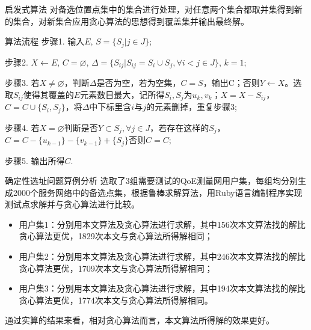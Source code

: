 \documentclass[10pt]{beamer}
\begin{document}
\begin{frame}{启发式算法}
对备选位置点集中的集合进行处理，对任意两个集合都取并集得到新的集合，对新集合应用贪心算法的思想得到覆盖集并输出最终解。
\begin{alertblock}{算法流程}
步骤1. 输入$E$, $S=\{S_j|j\in J\}$;

步骤2. $X\leftarrow E$, $C=\varnothing$, $\Delta = \{S_{ij}|S_{ij}=S_i\cup S_j, \forall i <j\in J\}$, $k=1$;

步骤3. 若$X\neq \varnothing$，判断$\Delta$是否为空，若为空集，$C=S$，输出C；否则$Y\leftarrow X$。选取$S_{ij}$使得其覆盖的$E$元素数目最大，记所得$S_i,S_j$为$u_k,v_k$；$X=X -S_{ij}$，$C=C\cup\{S_i,S_j\}$，将$\Delta$中下标里含$i$与$j$的元素删掉，重复步骤3;

步骤4. 若$X = \varnothing$判断是否$Y\subset S_j,\forall j\in J$，若存在这样的$S_j$，$C=C-\{u_{k-1}\}-\{v_{k-1}\}+\{S_j\}$否则$C=C$;

步骤5. 输出所得$C$.

\end{alertblock}

\end{frame}
\begin{frame}{确定性选址问题算例分析}
选取了3组需要测试的QoE测量网用户集，每组均分别生成2000个服务网络中的备选点集，根据鲁棒求解算法，用Ruby语言编制程序实现测试点求解并与贪心算法进行比较。
\begin{itemize}  
  \item 用户集1：分别用本文算法及贪心算法进行求解，其中{\color{red}156}次本文算法找的解比贪心算法更优，{\color{blue}1829}次本文与贪心算法所得解相同；
  \item 用户集2：分别用本文算法及贪心算法进行求解，其中{\color{red}246}次本文算法找的解比贪心算法更优，{\color{blue}1709}次本文与贪心算法所得解相同；
  \item 用户集3：分别用本文算法及贪心算法进行求解，其中{\color{red}194}次本文算法找的解比贪心算法更优，{\color{blue}1774}次本文与贪心算法所得解相同。
\end{itemize}
通过实算的结果来看，相对贪心算法而言，本文算法所得解的效果更好。
\end{frame}
\end{document}
